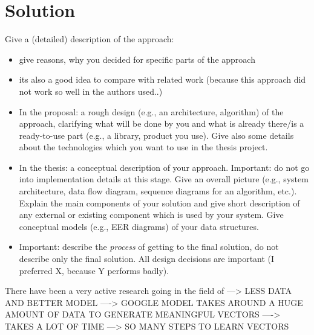 \chapter{Solution}
\label{cha:solutioni}

Give a (detailed) description of the approach:

\begin{itemize}
\item give reasons, why you decided for specific parts of the approach
\item its also a good idea to compare with related work (because this
		  approach did not work so well in \cite{conf/vldb/KenscheQXlYl07} the authors used..)
\item In the proposal: a rough design (e.g., an architecture, algorithm) of the approach,
		  clarifying what will be done by you and what is already there/is a ready-to-use part
		  (e.g., a library, product you use). Give also some details about the technologies
		  which you want to use in the thesis project.
\item In the thesis: a conceptual description of your approach. Important: do not go into
      implementation details at this stage. Give an overall picture (e.g., system architecture, data flow
      diagram, sequence diagrams for an algorithm, etc.). Explain the main components of your solution
      and give short description of any external or existing component which is used by your system.
      Give conceptual models (e.g., EER diagrams) of your data structures.
\item Important: describe the \emph{process} of getting to the final solution, do
      not describe only the final solution. All design decisions are important (I preferred
      X, because Y performs badly).
\end{itemize}



There have been a very active research going in the field of 
---> LESS DATA AND BETTER MODEL
----> GOOGLE MODEL TAKES AROUND A HUGE AMOUNT OF DATA TO GENERATE MEANINGFUL VECTORS
----> TAKES A LOT OF TIME
---> SO MANY STEPS TO LEARN VECTORS